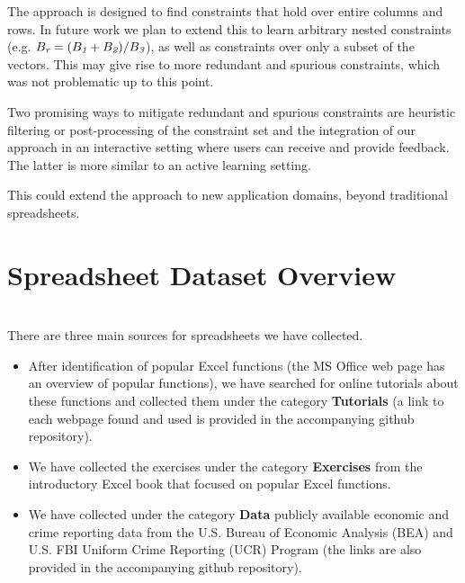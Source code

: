 The approach is designed to find constraints that hold over entire columns and rows. In future work we plan to extend this to learn arbitrary nested constraints (e.g. $B_{\textit{r}} = (B_{\textit{1}} + B_{\textit{2}}) / B_{\textit{3}}$), as well as constraints over only a subset of the vectors. This may give rise to more redundant and spurious constraints, which was not problematic up to this point.

Two promising ways to mitigate redundant and spurious constraints are heuristic filtering or post-processing of the constraint set and the integration of our approach in an interactive setting where users can receive and provide feedback.
The latter is more similar to an active learning setting.

This could extend the approach to new application domains, beyond traditional spreadsheets.



{
  }
\appendix
\section{Spreadsheet Dataset Overview} \label{appendix:dataset_overview}
\\
There are three main sources for spreadsheets we have collected.
\begin{itemize}
  \item After identification of popular Excel functions (the MS Office web page has an overview of popular functions), we have searched for online tutorials about these functions and collected them under the category \textbf{Tutorials} (a link to each webpage found and used is provided in the accompanying github repository).
  \item We have collected the exercises under the category \textbf{Exercises} from the introductory Excel book \cite{excel_book} that focused on popular Excel functions.
  \item We have collected under the category \textbf{Data} publicly available economic and crime reporting data from the U.S. Bureau of Economic Analysis (BEA) and U.S. FBI Uniform Crime Reporting (UCR) Program (the links are also provided in the accompanying github repository).
\end{itemize}

